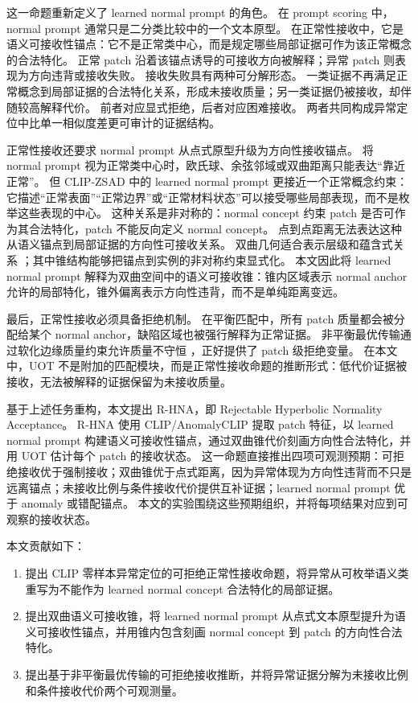 \documentclass[UTF8,fontset=none,10pt]{ctexart}
\newcommand{\method}{R-HNA}
\newcommand{\clip}{\textsc{CLIP}}
\begin{document}
这一命题重新定义了 learned normal prompt 的角色。
在 prompt scoring 中，normal prompt 通常只是二分类比较中的一个文本原型。
在正常性接收中，它是语义可接收性锚点：它不是正常类中心，而是规定哪些局部证据可作为该正常概念的合法特化。
正常 patch 沿着该锚点诱导的可接收方向被解释；异常 patch 则表现为方向违背或接收失败。
接收失败具有两种可分解形态。
一类证据不再满足正常概念到局部证据的合法特化关系，形成未接收质量；另一类证据仍被接收，却伴随较高解释代价。
前者对应显式拒绝，后者对应困难接收。
两者共同构成异常定位中比单一相似度差更可审计的证据结构。

正常性接收还要求 normal prompt 从点式原型升级为方向性接收锚点。
将 normal prompt 视为正常类中心时，欧氏球、余弦邻域或双曲距离只能表达“靠近正常”。
但 CLIP-ZSAD 中的 learned normal prompt 更接近一个正常概念约束：它描述“正常表面”“正常边界”或“正常材料状态”可以接受哪些局部表现，而不是枚举这些表现的中心。
这种关系是非对称的：normal concept 约束 patch 是否可作为其合法特化，patch 不能反向定义 normal concept。
点到点距离无法表达这种从语义锚点到局部证据的方向性可接收关系。
双曲几何适合表示层级和蕴含式关系 \cite{PoincareEmbeddings, HyperbolicNeuralNetworks, HyperbolicVisionLanguage}；其中锥结构能够把锚点到实例的非对称约束显式化。
本文因此将 learned normal prompt 解释为双曲空间中的语义可接收锥：锥内区域表示 normal anchor 允许的局部特化，锥外偏离表示方向性违背，而不是单纯距离变远。

最后，正常性接收必须具备拒绝机制。
在平衡匹配中，所有 patch 质量都会被分配给某个 normal anchor，缺陷区域也被强行解释为正常证据。
非平衡最优传输通过软化边缘质量约束允许质量不守恒 \cite{UnbalancedOptimalTransport, Sinkhorn}，正好提供了 patch 级拒绝变量。
在本文中，UOT 不是附加的匹配模块，而是正常性接收命题的推断形式：低代价证据被接收，无法被解释的证据保留为未接收质量。

基于上述任务重构，本文提出 \method{}，即 Rejectable Hyperbolic Normality Acceptance。
\method{} 使用 \clip{}/AnomalyCLIP 提取 patch 特征，以 learned normal prompt 构建语义可接收性锚点，通过双曲锥代价刻画方向性合法特化，并用 UOT 估计每个 patch 的接收状态。
这一命题直接推出四项可观测预期：可拒绝接收优于强制接收；双曲锥优于点式距离，因为异常体现为方向性违背而不只是远离锚点；未接收比例与条件接收代价提供互补证据；learned normal prompt 优于 anomaly 或错配锚点。
本文的实验围绕这些预期组织，并将每项结果对应到可观察的接收状态。

本文贡献如下：
\begin{enumerate}[leftmargin=*]
    \item 提出 \clip{} 零样本异常定位的可拒绝正常性接收命题，将异常从可枚举语义类重写为不能作为 learned normal concept 合法特化的局部证据。
    \item 提出双曲语义可接收锥，将 learned normal prompt 从点式文本原型提升为语义可接收性锚点，并用锥内包含刻画 normal concept 到 patch 的方向性合法特化。
    \item 提出基于非平衡最优传输的可拒绝接收推断，并将异常证据分解为未接收比例和条件接收代价两个可观测量。
\end{enumerate}
\end{document}
